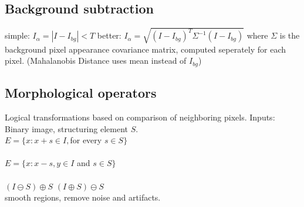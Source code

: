 \subsection*{Background subtraction}
simple: $I_\alpha = |I - I_{bg}| < T$ better: $I_\alpha = \sqrt{(I - I_{bg})^T \Sigma^{-1} (I - I_{bg})}$ where $\Sigma$ is the background pixel appearance covariance matrix, computed seperately for each pixel. (Mahalanobis Distance uses mean instead of $I_{bg}$)
\subsection*{Morphological operators}
Logical transformations based on comparison of neighboring pixels. Inputs: Binary image, structuring element $S$. \\
 $E = \{x:x+s \in I, $for every $ s \in S\}$\\
 \\
  $E = \{x:x-s, y \in I $ and $ s \in S\}$\\
\\
 $(I \ominus S) \oplus S$ \quad
{} $(I \oplus S) \ominus S$\\
 smooth regions, remove noise and artifacts.